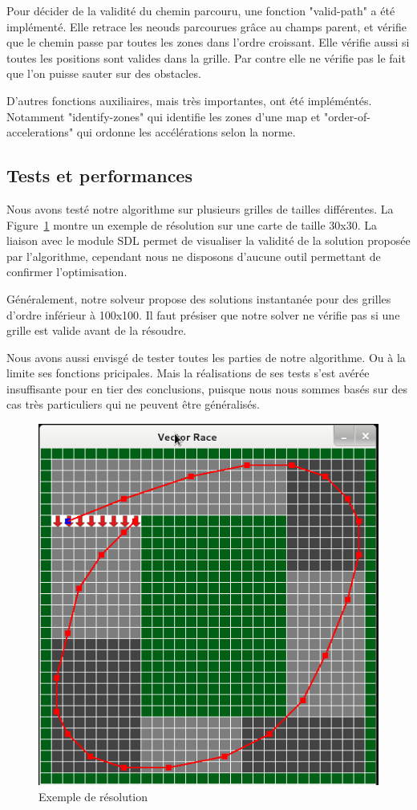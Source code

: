 Pour décider de la validité du chemin parcouru, une fonction "valid-path" a été implémenté. Elle retrace les neouds parcourues grâce au champs parent, et vérifie que le chemin passe par toutes les zones dans l'ordre croissant. Elle vérifie aussi si toutes les positions sont valides dans la grille. Par contre elle ne vérifie pas le fait que l'on puisse sauter sur des obstacles.

D'autres fonctions auxiliaires, mais très importantes, ont été impléméntés. Notamment "identify-zones" qui identifie les zones d'une map et "order-of-accelerations" qui ordonne les accélérations selon la norme.
\subsection{Tests et performances}

Nous avons testé notre algorithme sur plusieurs grilles de tailles différentes. La Figure~\ref{solution} montre un exemple de résolution sur une carte de taille 30x30. La liaison avec le module SDL permet de visualiser la validité de la solution proposée par l'algorithme, cependant nous ne disposons d'aucune outil permettant de confirmer l'optimisation.

Généralement, notre solveur propose des solutions instantanée pour des grilles d'ordre inférieur à 100x100. Il faut présiser que notre solver ne vérifie pas si une grille est valide avant de la résoudre.

Nous avons aussi envisgé de tester toutes les parties de notre algorithme. Ou à la limite ses fonctions pricipales. Mais la réalisations de ses tests s'est avérée insuffisante pour en tier des conclusions, puisque nous nous sommes basés sur des cas très particuliers qui ne peuvent être généralisés.
\begin{figure}[h]
\centering 
\includegraphics[scale=0.5]{Capture_du_2014-05-27_22-22-04.png}
\caption{Exemple de résolution}\label{solution}
\end{figure}